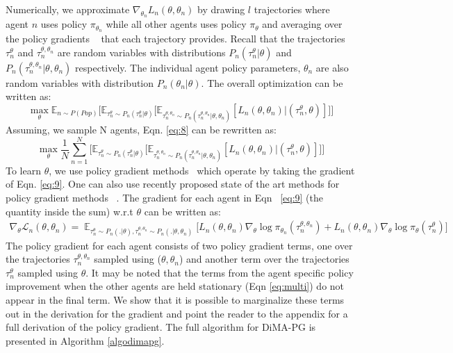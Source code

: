 \documentclass{article}
\begin{document}
Numerically, we approximate $\nabla_{\theta_n} L_n(\theta,\theta_n)$ by drawing $l$ trajectories where agent $n$ uses policy $\pi_{\theta_n}$ while all other agents uses policy $\pi_\theta$ and averaging over the policy gradients ~\cite{reinforce,sutton1998reinforcement} that each trajectory provides. Recall that the trajectories $\tau_{n}^\theta$ and 
$\tau_{n}^{\theta,\theta_n}$ are random variables with distributions $P_{n}(\tau_{n}^\theta|\theta)$ and $P_n(\tau_{n}^{\theta,\theta_n}|\theta, \theta_n)$ respectively. The individual agent policy parameters, $\theta_n$ are also random variables with distribution $P_{n}(\theta_n | \theta)$. The overall optimization can be written as:
\begin{equation}
\label{eq:8}
\max_{\theta} \mathbb{E}_{n \sim P(Pop)} \Big[ \mathbb{E}_{\tau_{n}^\theta \sim P_{n}(\tau^{\theta}_{n}|\theta)} \Big[ \mathbb{E}_{\tau_{n}^{\theta,\theta_n} \sim P_{n}(\tau_{n}^{\theta, \theta_n}|\theta,\theta_n)} [L_{n}(\theta,\theta_n)|(\tau_{n}^{\theta},\theta)] \Big] \Big]
\end{equation}
Assuming, we sample N agents,  Eqn. \ref{eq:8} can be rewritten as: 
\begin{equation}
\label{eq:9}
\max_{\theta} \frac{1}{N}\sum_{n=1}^N \Big[ \mathbb{E}_{\tau_{n}^\theta \sim P_{n}(\tau^{\theta}_{n}|\theta)} \Big[ \mathbb{E}_{\tau_{n}^{\theta,\theta_n} \sim P_{n}(\tau_{n}^{\theta, \theta_n}|\theta,\theta_n)} [L_{n}(\theta,\theta_n)|(\tau_{n}^{\theta},\theta)] \Big] \Big]
\end{equation}
To learn $\theta$, we use policy gradient methods~\cite{reinforce,sutton1998reinforcement} which operate by taking the gradient of Eqn. \ref{eq:9}. One can also use recently proposed state of the art methods for policy gradient methods ~\cite{gae,schulman2015trust}. The gradient for each agent in Eqn ~\ref{eq:9} (the quantity inside the sum) w.r.t $\theta$ can be written as:
\begin{equation}
\label{polgrad}
\begin{split}
\nabla_{\theta} \mathcal{L}_n(\theta,\theta_n) =\mathop{\mathbb{E}}_{\tau_{n}^\theta \sim P_{n}(.|\theta),\tau_{n}^{\theta,\theta_n} \sim P_{n} (.|\theta,\theta_n)} \Bigg[ L_{n}(\theta,\theta_n)\nabla_{\theta} \log \pi_{\theta_{n}}(\tau_{n}^{\theta,\theta_n}) + L_{n}(\theta,\theta_n)\nabla_{\theta}\log \pi_{\theta}(\tau_{n}^{\theta})\Bigg] 
\end{split}
\end{equation}
The policy gradient for each agent consists of two policy gradient terms, one over the trajectories $\tau_{n}^{\theta,\theta_n}$ sampled using ($\theta,\theta_n$) and another term over the trajectories $\tau_{n}^{\theta}$ sampled using $\theta$. It may be noted that the terms from the agent specific policy improvement when the other agents are held stationary (Eqn \ref{eq:multi}) do not appear in the final term. We show that it is possible to marginalize these terms out in the derivation for the gradient and point the reader to the appendix for a full derivation of the policy gradient. The full algorithm for DiMA-PG is presented in Algorithm \ref{algodimapg}. 
\end{document}
